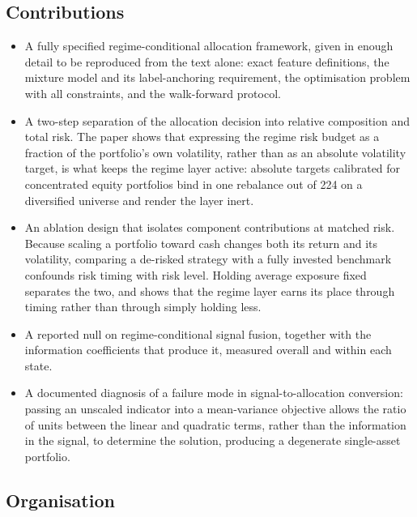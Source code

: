 \documentclass{singlecol-new}
\theoremstyle{TH}{
\newtheorem{lemma}{Lemma}
\newtheorem{theorem}[lemma]{Theorem}
\newtheorem{corrolary}[lemma]{Corrolary}
\newtheorem{conjecture}[lemma]{Conjecture}
\newtheorem{proposition}[lemma]{Proposition}
\newtheorem{claim}[lemma]{Claim}
\newtheorem{stheorem}[lemma]{Wrong Theorem}
\newtheorem{algorithm}{Algorithm}
}
\theoremstyle{THrm}{
\newtheorem{definition}{Definition}[section]
\newtheorem{question}{Question}[section]
\newtheorem{remark}{Remark}
\newtheorem{scheme}{Scheme}
}
\theoremstyle{THhit}{
\newtheorem{case}{Case}[section]
}
\begin{document}
\subsection{Contributions}

\begin{itemize}

\item A fully specified regime-conditional allocation framework, given in enough detail
to be reproduced from the text alone: exact feature definitions, the mixture model and
its label-anchoring requirement, the optimisation problem with all constraints, and the
walk-forward protocol.

\item A two-step separation of the allocation decision into relative composition and
total risk. The paper shows that expressing the regime risk budget as a fraction of the
portfolio's own volatility, rather than as an absolute volatility target, is what keeps
the regime layer active: absolute targets calibrated for concentrated equity portfolios
bind in one rebalance out of 224 on a diversified universe and render the layer inert.

\item An ablation design that isolates component contributions at matched risk. Because
scaling a portfolio toward cash changes both its return and its volatility, comparing a
de-risked strategy with a fully invested benchmark confounds risk timing with risk
level. Holding average exposure fixed separates the two, and shows that the regime
layer earns its place through timing rather than through simply holding less.

\item A reported null on regime-conditional signal fusion, together with the
information coefficients that produce it, measured overall and within each state.

\item A documented diagnosis of a failure mode in signal-to-allocation conversion:
passing an unscaled indicator into a mean-variance objective allows the ratio of units
between the linear and quadratic terms, rather than the information in the signal, to
determine the solution, producing a degenerate single-asset portfolio.

\end{itemize}

\subsection{Organisation}
\end{document}
